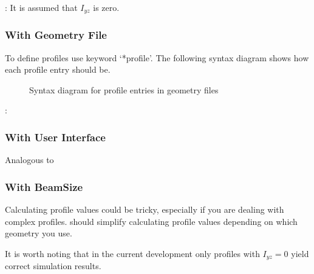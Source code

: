 \documentclass[letterpaper,10pt,english]{sphinxmanual}
\begin{document}
: It is assumed that \(I_{yz}\) is zero.


\subsubsection{With Geometry File}
\label{\detokenize{making_a_model:id19}}
To define profiles use keyword ‘*profile’.
The following syntax diagram shows how each profile entry should be.

\begin{figure}[htbp]
\centering
\capstart

\noindent{}
\caption{Syntax diagram for profile entries in geometry files}\label{\detokenize{making_a_model:id27}}\end{figure}

:

\begin{sphinxVerbatim}[commandchars=\\\{\}]
\end{sphinxVerbatim}


\subsubsection{With User Interface}
\label{\detokenize{making_a_model:id20}}
Analogous to {\hyperref[\detokenize{making_a_model:nodes-input}]{}}


\subsubsection{With BeamSize}
\label{\detokenize{making_a_model:with-beamsize}}
Calculating profile values could be tricky, especially if you are dealing with complex profiles.
 should simplify calculating profile values depending on which geometry you use.

It is worth noting that in the current development only profiles with \(I_{yz}=0\) yield correct simulation results.
\end{document}
